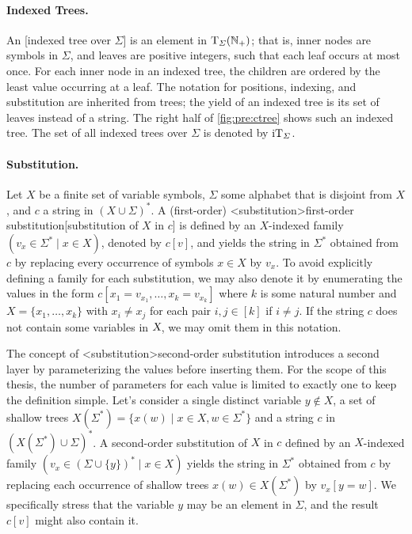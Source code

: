 \documentclass[../document.tex]{subfiles}
\begin{document}
    \paragraph{Indexed Trees.}
    An [indexed tree over \(\varSigma\)] is an element in \(\operatorname{T}_{\varSigma}(\mathbb{N}_+)\); that is, inner nodes are symbols in \(\varSigma\), and leaves are positive integers, such that each leaf occurs at most once.
    For each inner node in an indexed tree, the children are ordered by the least value occurring at a leaf.
    The notation for positions, indexing, and substitution are inherited from trees; the yield of an indexed tree is its set of leaves instead of a string.
    The right half of \cref{fig:pre:ctree} shows such an indexed tree.
    The set of all indexed trees over \(\varSigma\) is denoted by \(\operatorname{iT}_\varSigma\).

    \paragraph{Substitution.}
    Let \(X\) be a finite set of variable symbols, \(\varSigma\) some alphabet that is disjoint from \(X\), and \(c\) a string in \((X \cup \varSigma)^*\).
    A (first-order) <substitution>{first-order substitution}[substitution of \(X\) in \(c\)] is defined by an \(X\)-indexed family \((v_x \in \varSigma^* \mid x \in X)\), denoted by \(c[v]\), and yields the string in \(\varSigma^*\) obtained from \(c\) by replacing every occurrence of symbols \(x \in X\) by \(v_x\).
    To avoid explicitly defining a family for each substitution, we may also denote it by enumerating the values in the form \(c[x_1=v_{x_1}, \ldots, x_{k}=v_{x_k}]\) where \(k\) is some natural number and \(X = \{x_1, \ldots, x_k\}\) with \(x_i \neq x_j\) for each pair \(i,j \in [k]\) if \(i\neq j\).
    If the string \(c\) does not contain some variables in \(\textsl{X}\), we may omit them in this notation.

    The concept of <substitution>{second-order substitution} introduces a second layer by parameterizing the values before inserting them.
    For the scope of this thesis, the number of parameters for each value is limited to exactly one to keep the definition simple.
    Let's consider a single distinct variable \(y \notin X\), a set of shallow trees \(X(\varSigma^*) = \{ x(w) \mid x \in X, w \in \varSigma^* \}\) and a string \(c\) in \((X(\varSigma^*) \cup \varSigma)^*\).
    A second-order substitution of \(X\) in \(c\) defined by an \(X\)-indexed family \((v_x \in (\varSigma \cup \{y\})^* \mid x \in X)\) yields the string in \(\varSigma^*\) obtained from \(c\) by replacing each occurrence of shallow trees \(x(w) \in X(\varSigma^*)\) by \(v_x[y=w]\).
    We specifically stress that the variable \(y\) may be an element in \(\varSigma\), and the result \(c[v]\) might also contain it.
\end{document}
